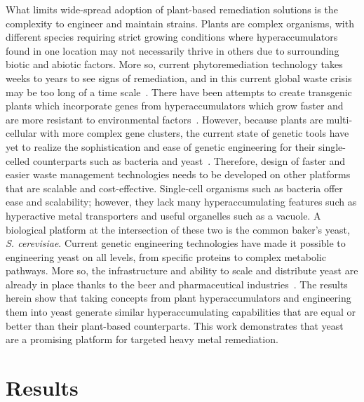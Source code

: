 \documentclass[../main/main]{subfiles}
\begin{document}
What limits wide-spread adoption of plant-based remediation solutions is the complexity to engineer and maintain strains. Plants are complex organisms, with different species requiring strict growing conditions where hyperaccumulators found in one location may not necessarily thrive in others due to surrounding biotic and abiotic factors. More so, current phytoremediation technology takes weeks to years to see signs of remediation, and in this current global waste crisis may be too long of a time scale~\cite{eapen2006,yang2004,sarma2011}. There have been attempts to create transgenic plants which incorporate genes from hyperaccumulators which grow faster and are more resistant to environmental factors~\cite{eapen2005}. However, because plants are multi-cellular with more complex gene clusters, the current state of genetic tools have yet to realize the sophistication and ease of genetic engineering for their single-celled counterparts such as bacteria and yeast~\cite{eapen2005}. Therefore, design of faster and easier waste management technologies needs to be developed on other platforms that are scalable and cost-effective. Single-cell organisms such as bacteria offer ease and scalability; however, they lack many hyperaccumulating features such as hyperactive metal transporters and useful organelles such as a vacuole. A biological platform at the intersection of these two is the common baker's yeast, \textit{S. cerevisiae}. Current genetic engineering technologies have made it possible to engineering yeast on all levels, from specific proteins to complex metabolic pathways.
More so, the infrastructure and ability to scale and distribute yeast are already in place thanks to the beer and pharmaceutical industries~\cite{barth-haasgroup.n.d.,bccresearch,prnewswire.n.d.}. The results herein show that taking concepts from plant hyperaccumulators and engineering them into yeast generate similar hyperaccumulating capabilities that are equal or better than their plant-based counterparts. This work demonstrates that yeast are a promising platform for targeted heavy metal remediation.

\section{Results}

\end{document}
